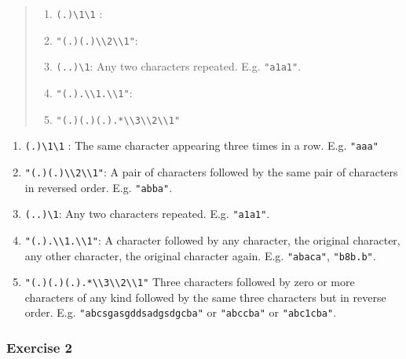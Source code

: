 \documentclass[]{book}
\providecommand{\tightlist}{%
  \setlength{\itemsep}{0pt}\setlength{\parskip}{0pt}}
\theoremstyle{definition}
\theoremstyle{definition}
\theoremstyle{definition}
\theoremstyle{remark}
\begin{document}
\begin{quote}
\begin{enumerate}
\def\labelenumi{\arabic{enumi}.}
\tightlist
\item
  \texttt{(.)\textbackslash{}1\textbackslash{}1} :
\item
  \texttt{"(.)(.)\textbackslash{}\textbackslash{}2\textbackslash{}\textbackslash{}1"}:
\item
  \texttt{(..)\textbackslash{}1}: Any two characters repeated. E.g.
  \texttt{"a1a1"}.
\item
  \texttt{"(.).\textbackslash{}\textbackslash{}1.\textbackslash{}\textbackslash{}1"}:
\item
  \texttt{"(.)(.)(.).*\textbackslash{}\textbackslash{}3\textbackslash{}\textbackslash{}2\textbackslash{}\textbackslash{}1"}
\end{enumerate}
\end{quote}

\begin{enumerate}
\def\labelenumi{\arabic{enumi}.}
\tightlist
\item
  \texttt{(.)\textbackslash{}1\textbackslash{}1} : The same character
  appearing three times in a row. E.g. \texttt{"aaa"}
\item
  \texttt{"(.)(.)\textbackslash{}\textbackslash{}2\textbackslash{}\textbackslash{}1"}:
  A pair of characters followed by the same pair of characters in
  reversed order. E.g. \texttt{"abba"}.
\item
  \texttt{(..)\textbackslash{}1}: Any two characters repeated. E.g.
  \texttt{"a1a1"}.
\item
  \texttt{"(.).\textbackslash{}\textbackslash{}1.\textbackslash{}\textbackslash{}1"}:
  A character followed by any character, the original character, any
  other character, the original character again. E.g. \texttt{"abaca"},
  \texttt{"b8b.b"}.
\item
  \texttt{"(.)(.)(.).*\textbackslash{}\textbackslash{}3\textbackslash{}\textbackslash{}2\textbackslash{}\textbackslash{}1"}
  Three characters followed by zero or more characters of any kind
  followed by the same three characters but in reverse order. E.g.
  \texttt{"abcsgasgddsadgsdgcba"} or \texttt{"abccba"} or
  \texttt{"abc1cba"}.
\end{enumerate}

\hypertarget{exercise-2-29}{%
\subsubsection{Exercise 2}\label{exercise-2-29}}
\end{document}
